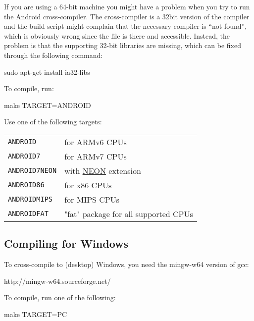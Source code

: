 If you are using a 64-bit machine you might have a problem when you try to run the Android cross-compiler. 
The cross-compiler is a 32bit version of the compiler and the build script might complain that the necessary 
compiler is “not found”, which is obviously wrong since the file is there and accessible. Instead, the problem is
that the supporting 32-bit libraries are missing, which can be fixed through the following command:

\begin{verbatim*}
sudo apt-get install ia32-libs
\end{verbatim*}

To compile, run:

\begin{verbatim*}
make TARGET=ANDROID
\end{verbatim*}

Use one of the following targets:

\begin{tabular}{lp{8cm}}

\texttt{ANDROID} & for ARMv6 CPUs \\

\texttt{ANDROID7} & for ARMv7 CPUs \\

\texttt{ANDROID7NEON} & with
\href{http://www.arm.com/products/processors/technologies/neon.php}{NEON}
extension \\

\texttt{ANDROID86} & for x86 CPUs \\

\texttt{ANDROIDMIPS} & for MIPS CPUs \\

\texttt{ANDROIDFAT} & "fat" package for all supported CPUs \\

\end{tabular}

\subsection{Compiling for Windows}

To cross-compile to (desktop) Windows, you need the mingw-w64 version
of gcc:

 http://mingw-w64.sourceforge.net/

To compile, run one of the following:

\begin{verbatim*}
make TARGET=PC
\end{verbatim*}

